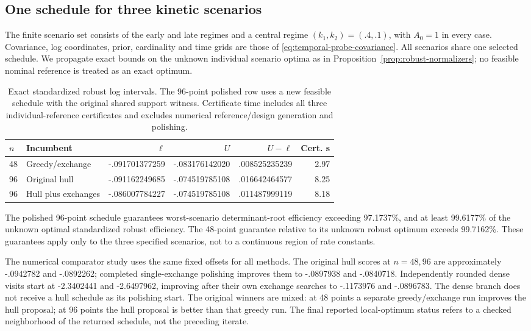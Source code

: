 \subsection{One schedule for three kinetic scenarios}\label{subsec:robust-experiments}

The finite scenario set consists of the early and late regimes and a central
regime $(k_1,k_2)=(.4,.1)$, with $A_0=1$ in every case. Covariance, log
coordinates, prior, cardinality and time grids are those of
\eqref{eq:temporal-probe-covariance}. All scenarios share one selected schedule.
We propagate exact bounds on the unknown individual scenario optima as in
Proposition~\ref{prop:robust-normalizers}; no feasible nominal reference is
treated as an exact optimum.

\begin{table}[htbp]
\centering\small
\caption{Exact standardized robust log intervals. The 96-point polished row
uses a new feasible schedule with the original shared support witness.
Certificate time includes all three individual-reference certificates and
excludes numerical reference/design generation and polishing.}
\label{tab:robust-certificates}
\begin{tabular}{llrrrr}
\toprule
$n$ & Incumbent & $\ell$ & $U$ & $U-\ell$ & Cert. s\\
\midrule
48 & Greedy/exchange & -.091701377259 & -.083176142020 & .008525235239 & 2.97\\
96 & Original hull & -.091162249685 & -.074519785108 & .016642464577 & 8.25\\
96 & Hull plus exchanges & -.086007784227 & -.074519785108 & .011487999119 & 8.18\\
\bottomrule
\end{tabular}
\end{table}

The polished 96-point schedule guarantees worst-scenario determinant-root
efficiency exceeding 97.1737\%, and at least 99.6177\% of the unknown optimal
standardized robust efficiency. The 48-point guarantee relative to its unknown
robust optimum exceeds 99.7162\%. These guarantees apply only to the three
specified scenarios, not to a continuous region of rate constants.

The numerical comparator study uses the same fixed offsets for all methods.
The original hull scores at $n=48,96$ are approximately -.0942782 and
-.0892262; completed single-exchange polishing improves them to -.0897938
and -.0840718. Independently rounded dense visits start at -2.3402441 and
-2.6497962, improving after their own exchange searches to -.1173976 and
-.0896783. The dense branch does not receive a hull schedule as its polishing
start. The original winners are mixed: at 48 points a separate greedy/exchange
run improves the hull proposal; at 96 points the hull proposal is better than
that greedy run. The final reported local-optimum status refers to a checked
neighborhood of the returned schedule, not the preceding iterate.

